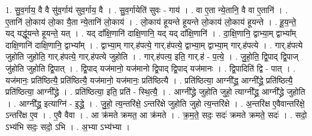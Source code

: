 \documentclass[17pt]{extarticle}
\begin{document}
1. सु॒व॒र्गाय॒ वै वै सु॑व॒र्गाय॑ सुव॒र्गाय॒ वै । . सु॒व॒र्गायेति॑ सुवः - गाय॑ । . वा ए॒ता न्ये॒तानि॒ वै वा ए॒तानि॑ । . ए॒तानि॑ लो॒काय॑ लो॒का यै॒ता न्ये॒तानि॑ लो॒काय॑ । . लो॒काय॑ हूयन्ते हूयन्ते लो॒काय॑ लो॒काय॑ हूयन्ते । . हू॒य॒न्ते॒ यद् यद्धू॑यन्ते हूयन्ते॒ यत् । . यद् दा᳚क्षि॒णानि॑ दाक्षि॒णानि॒ यद् यद् दा᳚क्षि॒णानि॑ । . दा॒क्षि॒णानि॒ द्वाभ्या॒म् द्वाभ्या᳚म् दाक्षि॒णानि॑ दाक्षि॒णानि॒ द्वाभ्या᳚म् । . द्वाभ्या॒म् गार्.ह॑पत्ये॒ गार्.ह॑पत्ये॒ द्वाभ्या॒म् द्वाभ्या॒म् गार्.ह॑पत्ये । . गार्.ह॑पत्ये जुहोति जुहोति॒ गार्.ह॑पत्ये॒ गार्.ह॑पत्ये जुहोति । . गार्.ह॑पत्य॒ इति॒ गार्.ह॑ - प॒त्ये॒ । . जु॒हो॒ति॒ द्वि॒पाद् द्वि॒पाज् जु॑होति जुहोति द्वि॒पात् । . द्वि॒पाद् यज॑मानो॒ यज॑मानो द्वि॒पाद् द्वि॒पाद् यज॑मानः । . द्वि॒पादिति॑ द्वि - पात् । . यज॑मानः॒ प्रति॑ष्ठित्यै॒ प्रति॑ष्ठित्यै॒ यज॑मानो॒ यज॑मानः॒ प्रति॑ष्ठित्यै । . प्रति॑ष्ठित्या॒ आग्नी᳚द्ध्र॒ आग्नी᳚द्ध्रे॒ प्रति॑ष्ठित्यै॒ प्रति॑ष्ठित्या॒ आग्नी᳚द्ध्रे । . प्रति॑ष्ठित्या॒ इति॒ प्रति॑ - स्थि॒त्यै॒ । . आग्नी᳚द्ध्रे जुहोति जुहो॒ त्याग्नी᳚द्ध्र॒ आग्नी᳚द्ध्रे जुहोति । . आग्नी᳚द्ध्र॒ इत्याग्नि॑ - इ॒द्ध्रे॒ । . जु॒हो॒ त्य॒न्तरि॑क्षे॒ ऽन्तरि॑क्षे जुहोति जुहो त्य॒न्तरि॑क्षे । . अ॒न्तरि॑क्ष ए॒वैवान्तरि॑क्षे॒ ऽन्तरि॑क्ष ए॒व । . ए॒वै वैवा । . आ क्र॑मते क्रमत॒ आ क्र॑मते । . क्र॒म॒ते॒ सदः॒ सदः॑ क्रमते क्रमते॒ सदः॑ । . सदो॒ ऽभ्य॑भि सदः॒ सदो॒ ऽभि । . अ॒भ्या ऽभ्य॑भ्या । \newline
\end{document}
